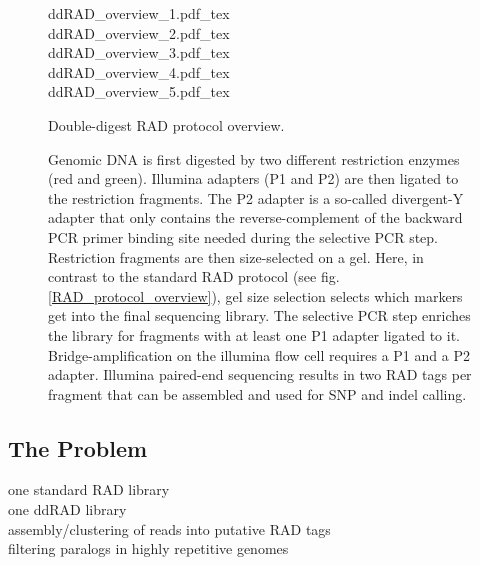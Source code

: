 \documentclass[a4paper,12pt,times,print,index, custombib]{PhDThesisPSnPDF}\usepackage[]{graphicx}\usepackage[]{color}
\begin{document}
\begin{figure}
\def\svgwidth{.9\textwidth}
{ddRAD_overview_1.pdf_tex}\\ 
\def\svgwidth{\textwidth}
{ddRAD_overview_2.pdf_tex}\\
\def\svgwidth{.9\textwidth}
{ddRAD_overview_3.pdf_tex}\\
\def\svgwidth{.9\textwidth}
{ddRAD_overview_4.pdf_tex}\\
\def\svgwidth{.9\textwidth}
{ddRAD_overview_5.pdf_tex}
\caption[Double-digest RAD protocol overview.]{Double-digest RAD protocol overview.}
\label{ddRAD_protocol_overview}
\end{figure}

\begin{figure}[t]
\ContinuedFloat
\caption[]{Genomic DNA is first digested by two different restriction enzymes (red and green). Illumina adapters (P1 and P2) are then ligated to the restriction fragments. The P2 adapter is a so-called divergent-Y adapter that only contains the reverse-complement of the backward PCR primer binding site needed during the selective PCR step. Restriction fragments are then size-selected on a gel. Here, in contrast to the standard RAD protocol (see fig. \ref{RAD_protocol_overview}), gel size selection selects which markers get into the final sequencing library. The selective PCR step enriches the library for fragments with at least one P1 adapter ligated to it. Bridge-amplification on the illumina flow cell requires a P1 and a P2 adapter. Illumina paired-end sequencing results in two RAD tags per fragment that can be assembled and used for SNP and indel calling.}
\end{figure}


\subsection{The Problem}
one standard RAD library \\
one ddRAD library \\
assembly/clustering of reads into putative RAD tags \\
filtering paralogs in highly repetitive genomes \\
\end{document}
